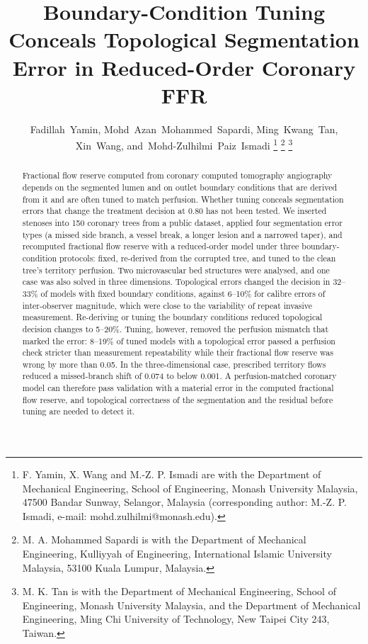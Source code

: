 \documentclass[journal]{IEEEtran}
\begin{document}
\title{Boundary-Condition Tuning Conceals Topological Segmentation Error in Reduced-Order Coronary FFR}

\author{Fadillah~Yamin,
        Mohd~Azan~Mohammed~Sapardi,
        Ming~Kwang~Tan,
        Xin~Wang,
        and~Mohd-Zulhilmi~Paiz~Ismadi%
\thanks{F. Yamin, X. Wang and M.-Z. P. Ismadi are with the Department of Mechanical Engineering, School of
Engineering, Monash University Malaysia, 47500 Bandar Sunway, Selangor, Malaysia (corresponding author:
M.-Z. P. Ismadi, e-mail: mohd.zulhilmi@monash.edu).}%
\thanks{M. A. Mohammed Sapardi is with the Department of Mechanical Engineering, Kulliyyah of Engineering,
International Islamic University Malaysia, 53100 Kuala Lumpur, Malaysia.}%
\thanks{M. K. Tan is with the Department of Mechanical Engineering, School of Engineering, Monash University
Malaysia, and the Department of Mechanical Engineering, Ming Chi University of Technology, New Taipei City 243,
Taiwan.}}


\maketitle

\begin{abstract}
Fractional flow reserve computed from coronary computed tomography angiography depends on the segmented lumen and on
outlet boundary conditions that are derived from it and are often tuned to match perfusion. Whether tuning conceals
segmentation errors that change the treatment decision at 0.80 has not been tested. We
inserted stenoses into 150 coronary trees from a public dataset, applied four segmentation error types (a missed side
branch, a vessel break, a longer lesion and a narrowed taper), and recomputed fractional flow reserve with a
reduced-order model under three boundary-condition protocols: fixed, re-derived from the corrupted tree, and tuned to
the clean tree's territory perfusion. Two microvascular bed structures were analysed, and one case was also solved in three
dimensions. Topological errors changed the decision in 32--33\% of models with
fixed boundary conditions, against 6--10\% for calibre errors of inter-observer magnitude, which were close to the
variability of repeat invasive measurement. Re-deriving or tuning the boundary conditions reduced topological
decision changes to 5--20\%. Tuning, however, removed the perfusion mismatch that marked the error: 8--19\% of tuned
models with a topological error passed a perfusion check stricter than measurement repeatability while their
fractional flow reserve was wrong by more than 0.05. In the three-dimensional case, prescribed territory flows
reduced a missed-branch shift of 0.074 to below 0.001. A perfusion-matched coronary model can therefore pass
validation with a material error in the computed fractional flow reserve, and topological correctness of the
segmentation and the residual before tuning are needed to detect it.
\end{abstract}
\end{document}
